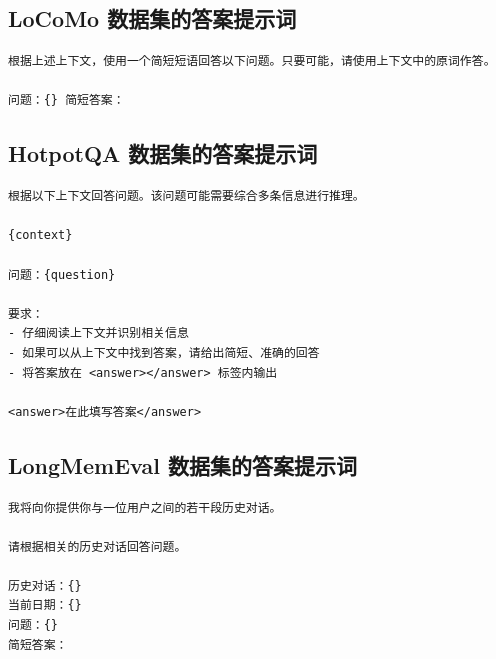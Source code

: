 \subsection{LoCoMo 数据集的答案提示词}

\begin{center}
\begin{tcolorbox}[title={LoCoMo 数据集的答案提示词}]
\begin{Verbatim}[breaklines, breakanywhere, fontsize=\small,
                 fontfamily=tt, fontseries=b]
根据上述上下文，使用一个简短短语回答以下问题。只要可能，请使用上下文中的原词作答。

问题：{} 简短答案：
\end{Verbatim}
\end{tcolorbox}
\end{center}

\subsection{HotpotQA 数据集的答案提示词}

\begin{center}
\begin{tcolorbox}[title={HotpotQA 数据集的答案提示词}]
{
\begin{Verbatim}[breaklines, breakanywhere, fontsize=\small,
                 fontfamily=tt, fontseries=b]
根据以下上下文回答问题。该问题可能需要综合多条信息进行推理。

{context}

问题：{question}

要求：
- 仔细阅读上下文并识别相关信息
- 如果可以从上下文中找到答案，请给出简短、准确的回答
- 将答案放在 <answer></answer> 标签内输出

<answer>在此填写答案</answer>
\end{Verbatim}
}
\end{tcolorbox}
\end{center}

\subsection{LongMemEval 数据集的答案提示词}

\begin{center}
\begin{tcolorbox}[title={LongMemEval 数据集的答案提示词}]
{
\begin{Verbatim}[breaklines, breakanywhere, fontsize=\small,
                 fontfamily=tt, fontseries=b]
我将向你提供你与一位用户之间的若干段历史对话。

请根据相关的历史对话回答问题。

历史对话：{}
当前日期：{}
问题：{}
简短答案：
\end{Verbatim}
}
\end{tcolorbox}
\end{center}

